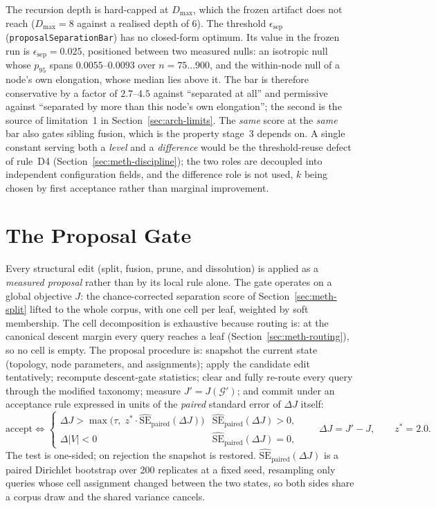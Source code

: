 The recursion depth is hard-capped at $D_{\max}$, which the frozen artifact does not
reach ($D_{\max} = 8$ against a realised depth of 6).
The threshold $\epsilon_{\text{sep}}$ (\texttt{proposalSeparationBar}) has no closed-form
optimum. Its value in the frozen run is $\epsilon_{\text{sep}} = 0.025$, positioned
between two measured nulls: an isotropic null whose $p_{95}$ spans $0.0055$--$0.0093$
over $n = 75\ldots900$, and the within-node null of a node's own elongation, whose median
lies above it. The bar is therefore conservative by a factor of $2.7$--$4.5$ against
``separated at all'' and permissive against ``separated by more than this node's own
elongation''; the second is the source of limitation~1 in Section~\ref{sec:arch-limits}.
The \emph{same} score at the \emph{same} bar also gates sibling fusion, which is the
property stage~3 depends on. A single constant serving both a \emph{level} and a
\emph{difference} would be the threshold-reuse defect of rule~D4
(Section~\ref{sec:meth-discipline}); the two roles are decoupled into independent
configuration fields, and the difference role is not used, $k$ being chosen by first
acceptance rather than marginal improvement.

\section{The Proposal Gate}\label{sec:meth-proposal-gate}

Every structural edit (split, fusion, prune, and dissolution) is applied as a
\emph{measured proposal} rather than by its local rule alone.
The gate operates on a global objective $J$: the chance-corrected separation score of
Section~\ref{sec:meth-split} lifted to the whole corpus, with one cell per leaf, weighted
by soft membership.
The cell decomposition is exhaustive because routing is: at the canonical descent
margin every query reaches a leaf (Section~\ref{sec:meth-routing}), so no cell is empty.
The proposal procedure is: snapshot the current state (topology, node parameters, and
assignments); apply the candidate edit tentatively; recompute descent-gate statistics;
clear and fully re-route every query through the modified taxonomy; measure
$J' = J(\mathcal{G}')$; and commit under an acceptance rule expressed in units of the
\emph{paired} standard error of $\Delta J$ itself:
\[
\text{accept}
\iff
\begin{cases}
\Delta J > \max\bigl(\tau,\; z^{*}\cdot
\widehat{\mathrm{SE}}_{\text{paired}}(\Delta J)\bigr)
& \widehat{\mathrm{SE}}_{\text{paired}}(\Delta J) > 0,\\[4pt]
\Delta |V| < 0
& \widehat{\mathrm{SE}}_{\text{paired}}(\Delta J) = 0,
\end{cases}
\qquad
\Delta J = J' - J,
\qquad z^{*} = 2.0 .
\]
The test is one-sided; on rejection the snapshot is restored.
$\widehat{\mathrm{SE}}_{\text{paired}}(\Delta J)$ is a paired Dirichlet bootstrap over
200 replicates at a fixed seed, resampling only queries whose cell assignment changed
between the two states, so both sides share a corpus draw and the shared variance
cancels.

